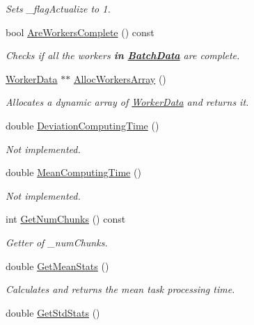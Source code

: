 \begin{DoxyCompactItemize}
\begin{DoxyCompactList}\small\item\em Sets \-\_\-flag\-Actualize to 1. \end{DoxyCompactList}\item 
bool \hyperlink{class_batch_data_ab599097b9e1f7fba2ad3b829ea80f266}{Are\-Workers\-Complete} () const 
\begin{DoxyCompactList}\small\item\em Checks if all the workers {\bfseries in \hyperlink{class_batch_data}{Batch\-Data}} are complete. \end{DoxyCompactList}\item 
\hyperlink{class_worker_data}{Worker\-Data} $\ast$$\ast$ \hyperlink{class_batch_data_aae7833fddc7826d093346e80c4b3eac6}{Alloc\-Workers\-Array} ()
\begin{DoxyCompactList}\small\item\em Allocates a dynamic array of \hyperlink{class_worker_data}{Worker\-Data} and returns it. \end{DoxyCompactList}\item 
double \hyperlink{class_batch_data_a68289b65f403f6b6a965cec4a2ceaa9e}{Deviation\-Computing\-Time} ()
\begin{DoxyCompactList}\small\item\em Not implemented. \end{DoxyCompactList}\item 
double \hyperlink{class_batch_data_a09cf749b9fbad1213a44c19346b1bb14}{Mean\-Computing\-Time} ()
\begin{DoxyCompactList}\small\item\em Not implemented. \end{DoxyCompactList}\item 
int \hyperlink{class_batch_data_ab2aa288ef12cf1f45b9bde2491c64178}{Get\-Num\-Chunks} () const 
\begin{DoxyCompactList}\small\item\em Getter of \-\_\-num\-Chunks. \end{DoxyCompactList}\item 
double \hyperlink{class_batch_data_ab44cab5811e64dcde891f900964ac2c8}{Get\-Mean\-Stats} ()
\begin{DoxyCompactList}\small\item\em Calculates and returns the mean task processing time. \end{DoxyCompactList}\item 
double \hyperlink{class_batch_data_aec492a90b67eb2c2affe84f4fc865a6c}{Get\-Std\-Stats} ()
$$
\end{DoxyCompactItemize}
